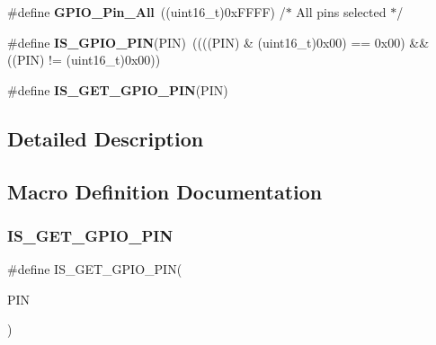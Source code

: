 \begin{DoxyCompactItemize}
\item 
\mbox{\label{group___g_p_i_o__pins__define_gaba3e915ddca17a1211edc07b7fd97e8b}} 
\#define {\bfseries G\+P\+I\+O\+\_\+\+Pin\+\_\+\+All}~((uint16\+\_\+t)0x\+F\+F\+F\+F)  /$\ast$ All pins selected $\ast$/
\item 
\mbox{\label{group___g_p_i_o__pins__define_gad6ec74e33360395535ad5d91ba6d4781}} 
\#define {\bfseries I\+S\+\_\+\+G\+P\+I\+O\+\_\+\+P\+IN}(P\+IN)~((((P\+IN) \& (uint16\+\_\+t)0x00) == 0x00) \&\& ((\+P\+I\+N) != (uint16\+\_\+t)0x00))
\item 
\#define {\bfseries I\+S\+\_\+\+G\+E\+T\+\_\+\+G\+P\+I\+O\+\_\+\+P\+IN}(P\+IN)
\end{DoxyCompactItemize}


\subsection{Detailed Description}


\subsection{Macro Definition Documentation}
\mbox{\label{group___g_p_i_o__pins__define_gaddf7154b7f30b7c0a70f3aeaff5ddffc}} 
\subsubsection{\texorpdfstring{I\+S\+\_\+\+G\+E\+T\+\_\+\+G\+P\+I\+O\+\_\+\+P\+IN}{IS\_GET\_GPIO\_PIN}}
{\footnotesize\ttfamily \#define I\+S\+\_\+\+G\+E\+T\+\_\+\+G\+P\+I\+O\+\_\+\+P\+IN(\begin{DoxyParamCaption}\item[{}]{P\+IN }\end{DoxyParamCaption})}

